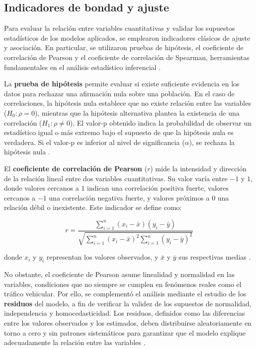 \documentclass[12pt]{article}
\begin{document}
\subsection{Indicadores de bondad y ajuste}

Para evaluar la relación entre variables cuantitativas y validar los supuestos estadísticos de los modelos aplicados, se emplearon indicadores clásicos de ajuste y asociación. En particular, se utilizaron pruebas de hipótesis, el coeficiente de correlación de Pearson y el coeficiente de correlación de Spearman, herramientas fundamentales en el análisis estadístico inferencial \parencite{devore2011, montgomery2018, field2018}.

La \textbf{prueba de hipótesis} permite evaluar si existe suficiente evidencia en los datos para rechazar una afirmación nula sobre una población. En el caso de correlaciones, la hipótesis nula establece que no existe relación entre las variables (\( H_0 : \rho = 0 \)), mientras que la hipótesis alternativa plantea la existencia de una correlación (\( H_1 : \rho \neq 0 \)). El valor-p obtenido indica la probabilidad de observar un estadístico igual o más extremo bajo el supuesto de que la hipótesis nula es verdadera. Si el valor-p es inferior al nivel de significancia (\( \alpha \)), se rechaza la hipótesis nula \parencite{devore2011}.

El \textbf{coeficiente de correlación de Pearson} (\( r \)) mide la intensidad y dirección de la relación lineal entre dos variables cuantitativas. Su valor varía entre $-1$ y $1$, donde valores cercanos a $1$ indican una correlación positiva fuerte, valores cercanos a $-1$ una correlación negativa fuerte, y valores próximos a $0$ una relación débil o inexistente. Este indicador se define como:

\begin{equation}
r = \frac{\sum_{i=1}^{n}(x_i - \bar{x})(y_i - \bar{y})}{\sqrt{\sum_{i=1}^{n}(x_i - \bar{x})^2 \sum_{i=1}^{n}(y_i - \bar{y})^2}}
\end{equation}

donde \( x_i \) y \( y_i \) representan los valores observados, y \( \bar{x} \) y \( \bar{y} \) sus respectivas medias \parencite{montgomery2018}.

No obstante, el coeficiente de Pearson asume linealidad y normalidad en las variables, condiciones que no siempre se cumplen en fenómenos reales como el tráfico vehicular. Por ello, se complementó el análisis mediante el estudio de los \textbf{residuos} del modelo, a fin de verificar la validez de los supuestos de normalidad, independencia y homocedasticidad. Los residuos, definidos como las diferencias entre los valores observados y los estimados, deben distribuirse aleatoriamente en torno a cero y sin patrones sistemáticos para garantizar que el modelo explique adecuadamente la relación entre las variables \parencite{montgomery2018}.
\end{document}
